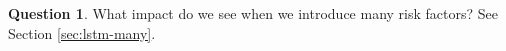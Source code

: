 \documentclass[12pt]{article}
\theoremstyle{definition}
\newtheorem{question}{Question}
\renewcommand{\_}{%
    \textunderscore\hspace{0pt}%
}
\begin{document}
\begin{question} What impact do we see when we introduce many risk factors? See Section \ref{sec:lstm-many}.
\label{q:4}
\end{question}



%
%

\end{document}

